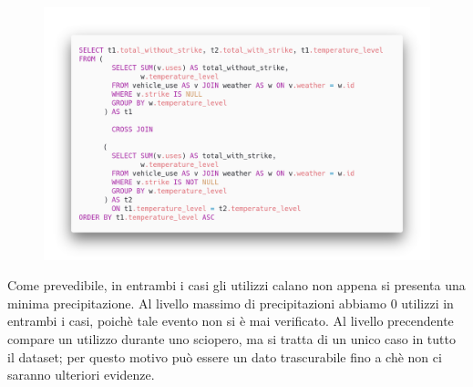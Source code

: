 \begin{figure}[H]                                                                                                                                                            
\centering                                                                                                                                                                   
\includegraphics[width=\textwidth]{images/query4}                                                                                                                                   
\label{fig:query4}                                                                                                                                                           
\end{figure}

Come prevedibile, in entrambi i casi gli utilizzi calano non appena si presenta una minima precipitazione.
Al livello massimo di precipitazioni abbiamo 0 utilizzi in entrambi i casi, poichè tale evento non si è mai verificato.
Al livello precendente compare un utilizzo durante uno sciopero, ma si tratta di un unico caso in tutto il dataset; per questo motivo può essere
un dato trascurabile fino a chè non ci saranno ulteriori evidenze.

